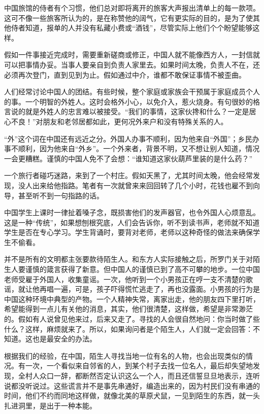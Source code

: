 \documentclass[12pt,oneside]{book}
\begin{document}
\begin{common-format}
中国旅馆的侍者有个习惯，他们总对即将离开的旅客大声报出清单上的每一款项。这可不像一些旅客所认为的，是在称赞他的阔气，它有更实际的目的，是为了使其他侍者知道，报单的人并没有私藏小费或“酒钱”，尽管实际上他们个个盼望能够这样。 

假如一件事接近完成时，需要重新磋商或修正，中国人就不能像西方人，一封信就可以把事情办妥。当事人要亲自到负责人家里去。如果时间太晚，负责人不在，还必须再次登门，直到见到为止。假如通过中介，谁都不敢保证事情不被歪曲。 

人们经常讨论中国人的团结。有些时候，整个家庭或家族会干预属于家庭成员个人的事。一个明智的外姓人。这时会格外小心，以免介入，惹火烧身。有句很妙的格言说的就是外姓人的忠言难以被接受。“我们的事情，这家伙搀和什么？一定是居心不良！”对朋友和老邻居都如此，更何况外来户和没有特殊关系的人。 

“外”这个词在中国还有远近之分。外国人办事不顺利，因为他来自“外国”；乡民办事不顺利，因为他来自“外乡”。一个外来者，背景不明，又不想让别人知道，情况一会更糟糕。谨慎的中国人免不了会想：“谁知道这家伙葫芦里装的是什么药？” 

一个旅行者碰巧迷路，来到了一个村庄。假如天黑了，尤其时间太晚，他会经常发现，没人出来给他指路。笔者有一次就曾来来回回转了几个小时，花钱也雇不到向导，甚至听不到一句指路的话。 

中国学生上课时一律扯着嗓子念，既损害他们的发声器官，也令外国人心烦意乱。这是一种“传统”，如果想刨根究底，人们会告诉你，听不到读书声，老师就不知道学生是否在专心学习。学生背诵时，要背对老师，老师以这种奇怪的做法来确保学生不偷看。 

并不是所有的文明都主张要款待陌生人。和东方人实际接触之后，所罗门关于对陌生人要谨慎的箴言获得了新意。但中国人的谨慎已到了高不可攀的地步。一位中国老师受雇于外国人，收集童谣。一次，他听到一个小男孩正在哼一支不清楚的歌谣，就让他再唱一遍，可是，孩子吓得慌忙逃走了，再也没露面。小男孩的行为是中国这种环境中典型的产物。一个人精神失常，离家出走，他的朋友四下里打听，希望能得到一点儿有关他的消息，其实，他们很清楚，这样做，希望是非常渺茫的。假如有人说曾见他来过，后来又走了。寻找的人会很自然地问：你当时做了些什么？这样，麻烦就来了。所以，如果询问者是个陌生人，人们就一定会回答：不知道。这也是最安全的办法。 

根据我们的经验，在中国，陌生人寻找当地一位有名的人物，也会出现类似的情况。有一次，一个看似来自邻省的人，到某个村子去找一位名人，最后却失望地发现，全村人众口一辞，都断然否定认识这么一个人，而且还信誓旦旦地表示，连听说都没听说过。这些谎言并不是事先串通好，编造出来的，因为村民们没有串通的时间，他们不约而同地这样做，就像北美的草原犬鼠，一见到陌生的东西，就一头扎进洞里，是出于一种本能。 


\end{common-format}
\end{document}
